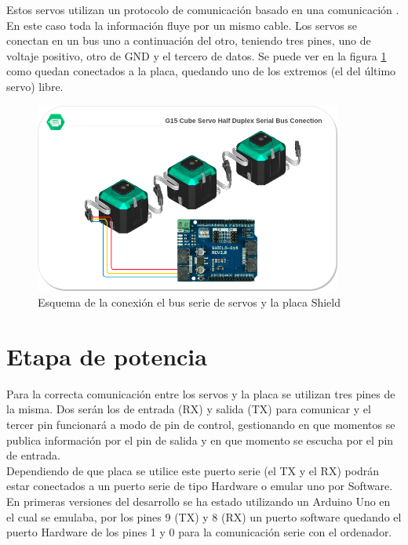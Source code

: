 	Estos servos utilizan un protocolo de comunicación basado en una comunicación . En este caso toda la información fluye por un mismo cable. Los servos se conectan en un bus uno a continuación del otro, teniendo tres pines, uno de voltaje positivo, otro de GND y el tercero de datos. Se puede ver en la figura \ref{fig:Electronica:bus-servos} como quedan conectados a la placa, quedando uno de los extremos (el del último servo) libre.
    \begin{figure}[H]
    	\centering
    	\includegraphics[width=0.9\textwidth]{figuras/Imagenes_Electronica/G15_bus_conection.png}
    	\caption{Esquema de la conexión el bus serie de servos y la placa Shield}
    	\label{fig:Electronica:bus-servos}
    \end{figure}

\section{Etapa de potencia} \label{sec:Electronica:Potencia}

	Para la correcta comunicación entre los servos y la placa se utilizan tres pines de la misma. Dos serán los de entrada (RX) y salida (TX) para comunicar y el tercer pin funcionará a modo de pin de control, gestionando en que momentos se publica información por el pin de salida y en que momento se escucha por el pin de entrada.
	\\

	Dependiendo de que placa se utilice este puerto serie (el TX y el RX) podrán estar conectados a un puerto serie de tipo Hardware o emular uno por Software.
	\\

	En primeras versiones del desarrollo se ha estado utilizando un Arduino Uno en el cual se emulaba, por los pines 9 (TX) y 8 (RX) un puerto software quedando el puerto Hardware de los pines 1 y 0 para la comunicación serie con el ordenador.
	\\

